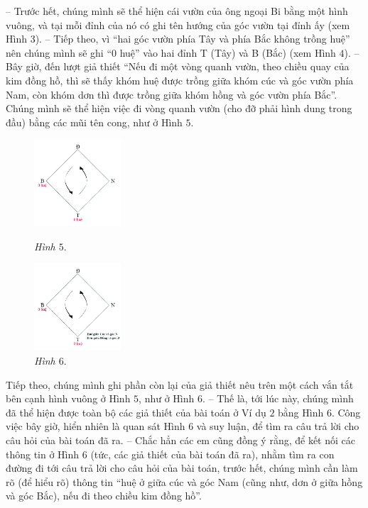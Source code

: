 	-- Trước hết, chúng mình sẽ thể hiện cái vườn của ông ngoại Bi bằng một hình vuông, và tại mỗi đỉnh của nó có ghi tên hướng của góc vườn tại đỉnh ấy (xem Hình $3$).
	\vskip 0.15cm
	-- Tiếp theo, vì “hai góc vườn phía Tây và phía Bắc không trồng huệ” nên chúng mình sẽ ghi “0 huệ” vào hai đỉnh T (Tây) và B (Bắc) (xem Hình $4$).
	\vskip 0.15cm
	-- Bây giờ, đến lượt giả thiết “Nếu đi một vòng quanh vườn, theo chiều quay của kim đồng hồ, thì sẽ thấy khóm huệ được trồng giữa khóm cúc và góc vườn phía Nam, còn khóm dơn thì được trồng giữa khóm hồng và góc vườn phía Bắc”. Chúng mình sẽ thể hiện việc đi vòng quanh vườn (cho đỡ phải hình dung trong đầu) bằng các mũi tên cong, như ở Hình $5$.
	\vskip 0.1cm
	\begin{figure}
		\vspace*{-15pt}
		\centering
		\captionsetup{labelformat=empty, justification=centering}
		\hspace*{-10pt}\includegraphics[width= 0.29\textwidth]{pic5}
		\caption{\textit{\small Hình $5.$}}
		\vspace*{5pt}
		\hspace*{-10pt}\includegraphics[width=0.29\textwidth]{pic6}
		\caption{\small\textit{Hình $6.$}}
		\vspace*{-20pt}
	\end{figure}
	\vskip 0.15cm
	Tiếp theo, chúng mình ghi phần còn lại của giả thiết nêu trên một cách vắn tắt bên cạnh hình vuông ở Hình $5$, như ở Hình $6$.
	\vskip 0.15cm
	-- Thế là, tới lúc này, chúng mình đã thể hiện được toàn bộ các giả thiết của bài toán ở Ví dụ $2$ bằng Hình $6$. Công việc bây giờ, hiển nhiên là quan sát Hình 6 và suy luận, để tìm ra câu trả lời cho câu hỏi của bài toán đã ra.
	\vskip 0.15cm
	-- Chắc hẳn các em cũng đồng ý rằng, để kết nối các thông tin ở Hình $6$ (tức, các giả thiết của bài toán đã ra), nhằm tìm ra con đường đi tới câu trả lời cho câu hỏi của bài toán, trước hết, chúng mình cần làm rõ (để hiểu rõ) thông tin “huệ ở giữa cúc và góc Nam (cũng như, dơn ở giữa hồng và góc Bắc), nếu đi theo chiều kim đồng hồ”.
